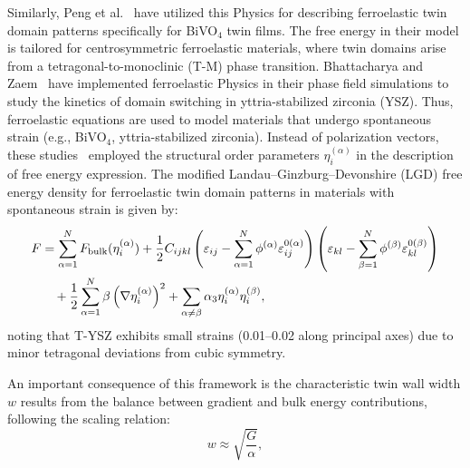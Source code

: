 \documentclass[a4paper,fleqn]{cas-sc}
\begin{document}
\par Similarly, Peng et al.~\cite{PENG2023119297} have utilized this Physics for describing ferroelastic twin domain patterns specifically for BiVO$_4$ twin films. The free energy in their model is tailored for centrosymmetric ferroelastic materials, where twin domains arise from a tetragonal-to-monoclinic (T-M) phase transition. Bhattacharya and Zaem~\cite{BHATTACHARYA2024120039, BHATTACHARYA2024116273,BHATTACHARYA2025120702} have implemented ferroelastic Physics in their phase field simulations to study the kinetics of domain switching in yttria-stabilized zirconia (YSZ). Thus, ferroelastic equations are used to model materials that undergo spontaneous strain (e.g., BiVO$_4$, yttria-stabilized zirconia). Instead of polarization vectors, these studies~\cite{PENG2023119297,BHATTACHARYA2024116273,BHATTACHARYA2025120702} employed the structural order parameters \( \eta_i^{(\alpha)} \) in the description of free energy expression. The modified Landau--Ginzburg--Devonshire (LGD) free energy density for ferroelastic twin domain patterns in materials with spontaneous strain is given by:
\begin{align} \label{lgd-bivo4-ferroelastic}
    F &= \sum_{\alpha=1}^N F_{\text{bulk}}(\eta_i^{(\alpha)}) + \frac{1}{2} C_{ijkl} \left( \varepsilon_{ij} - \sum_{\alpha=1}^N \phi^{(\alpha)} \varepsilon_{ij}^{0(\alpha)} \right) \left( \varepsilon_{kl} - \sum_{\beta=1}^N \phi^{(\beta)} \varepsilon_{kl}^{0(\beta)} \right) \notag \\
    &\quad + \frac{1}{2} \sum_{\alpha=1}^N \beta \left( \nabla \eta_i^{(\alpha)} \right)^2 + \sum_{\alpha \neq \beta} \alpha_3 \eta_i^{(\alpha)} \eta_i^{(\beta)},
\end{align}
noting that T-YSZ exhibits small strains (0.01–0.02 along principal axes)  due to minor tetragonal deviations from cubic symmetry.
\par An important consequence of this framework is the characteristic twin wall width \( w \) results from the balance between gradient and bulk energy contributions, following the scaling relation:
\begin{equation}
    w \approx \sqrt{\frac{G}{\alpha}},
\end{equation}
\end{document}
